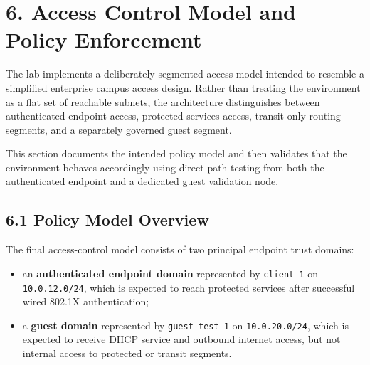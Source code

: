 \documentclass[11pt]{article}
\begin{document}

\section{6. Access Control Model and Policy Enforcement}
\label{sec:access-control-model-and-policy-enforcement}

The lab implements a deliberately segmented access model intended to resemble a simplified enterprise campus access design. Rather than treating the environment as a flat set of reachable subnets, the architecture distinguishes between authenticated endpoint access, protected services access, transit-only routing segments, and a separately governed guest segment.

This section documents the intended policy model and then validates that the environment behaves accordingly using direct path testing from both the authenticated endpoint and a dedicated guest validation node.


\subsection{6.1 Policy Model Overview}
\label{sec:policy-model-overview}

The final access-control model consists of two principal endpoint trust domains:

\begin{itemize}
    \item an \textbf{authenticated endpoint domain} represented by \texttt{client-1} on \texttt{10.0.12.0/24}, which is expected to reach protected services after successful wired 802.1X authentication;
    \item a \textbf{guest domain} represented by \texttt{guest-test-1} on \texttt{10.0.20.0/24}, which is expected to receive DHCP service and outbound internet access, but not internal access to protected or transit segments.
\end{itemize}
\end{document}
